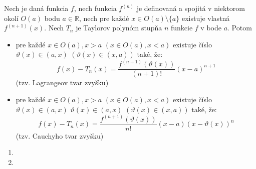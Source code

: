 \begin{veta}
Nech je daná funkcia $f$, nech funkcia $f^{(n)}$ je definovaná a spojitá v
niektorom okolí $O(a)$ bodu $a\in\mathbb{R}$, nech pre každé $x\in O(a)\setminus
\{a\}$ existuje vlastná $f^{(n+1)}(x)$. Nech $T_n$ je Taylorov polynóm stupňa
$n$ funkcie $f$ v bode $a$. Potom
\begin{itemize}
  \item
    pre každé $x\in O(a),x>a$ $(x\in O(a),x<a)$ existuje číslo $\vartheta (x)\in
    (a,x)$  $(\vartheta (x)\in (x,a))$ také, že:
    \[
      f(x)-T_n(x)=\frac{f^{(n+1)}(\vartheta (x))}{(n+1)!}(x-a)^{n+1}
    \]
    (tzv. Lagrangeov tvar zvyšku)
  \item
    pre každé $x\in O(a),x>a$  $(x\in O(a),x<a)$ existuje číslo $\vartheta
    (x)\in (a,x)$  $\vartheta (x)\in (a,x)$  $(\vartheta (x)\in (x,a))$ také,
    že:
    \[
      f(x)-T_n(x)=\frac{f^{(n+1)}(\vartheta (x))}{n!}(x-a)(x-\vartheta (x))^n
    \]
    (tzv. Cauchyho tvar zvyšku)
\end{itemize}
\end{veta}

\begin{enumerate}[resume]
  \item {}
  \item {}
\end{enumerate}
